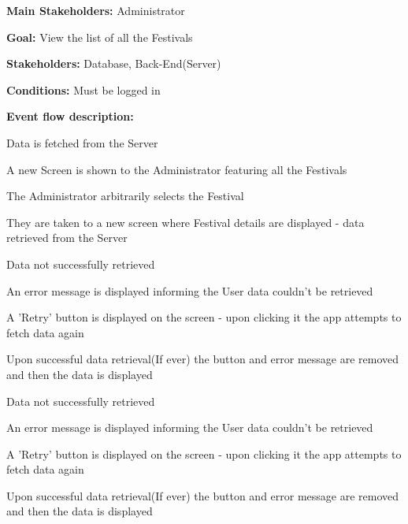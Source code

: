				\noindent {}
				\begin{packed_item}
					\item \textbf{Main Stakeholders:} Administrator
					\item \textbf{Goal:} View the list of all the Festivals
					\item \textbf{Stakeholders: } Database, Back-End(Server)
					\item \textbf{Conditions: } Must be logged in
					\item \textbf{Event flow description: }
					\begin{packed_enum}
						\item Data is fetched from the Server
						\item A new Screen is shown to the Administrator featuring all the Festivals
						\item The Administrator arbitrarily selects the Festival
						\item They are taken to a new screen where Festival details are displayed - data retrieved from the Server
					\end{packed_enum}
					
					\begin{packed_item}
						\item[1.a] Data not successfully retrieved
						\item[] \begin{packed_enum}
							\item An error message is displayed informing the User data couldn't be retrieved
							\item A 'Retry' button is displayed on the screen - upon clicking it the app attempts to fetch data again
							\item Upon successful data retrieval(If ever) the button and error message are removed and then the data is displayed
						\end{packed_enum}
						
						\item[4.a] Data not successfully retrieved
						\item[] \begin{packed_enum}
							\item An error message is displayed informing the User data couldn't be retrieved
							\item A 'Retry' button is displayed on the screen - upon clicking it the app attempts to fetch data again
							\item Upon successful data retrieval(If ever) the button and error message are removed and then the data is displayed
						\end{packed_enum}
					\end{packed_item}
				\end{packed_item}				
			
